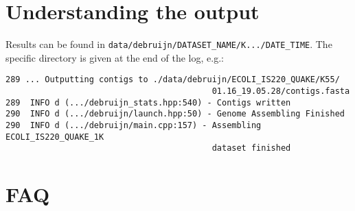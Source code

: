 \documentclass{article}
\begin{document}
\section{Understanding the output}
Results can be found in {\tt data/debruijn/DATASET\_NAME/K.../DATE\_TIME}.
The specific directory is given at the end of the log, e.g.:
\begin{lstlisting}
289 ... Outputting contigs to ./data/debruijn/ECOLI_IS220_QUAKE/K55/
                                          01.16_19.05.28/contigs.fasta
289  INFO d (.../debruijn_stats.hpp:540) - Contigs written
290  INFO d (.../debruijn/launch.hpp:50) - Genome Assembling Finished
290  INFO d (.../debruijn/main.cpp:157) - Assembling ECOLI_IS220_QUAKE_1K 
                                          dataset finished
\end{lstlisting}


\section{FAQ}
\end{document}
